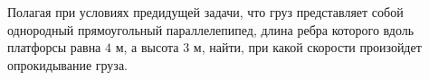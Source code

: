 Полагая при условиях предидущей задачи, что груз представляет собой однородный
прямоугольный параллелепипед, длина ребра которого вдоль платфорсы равна $4$ м,
а высота $3$ м, найти, при какой скорости произойдет опрокидывание груза.

